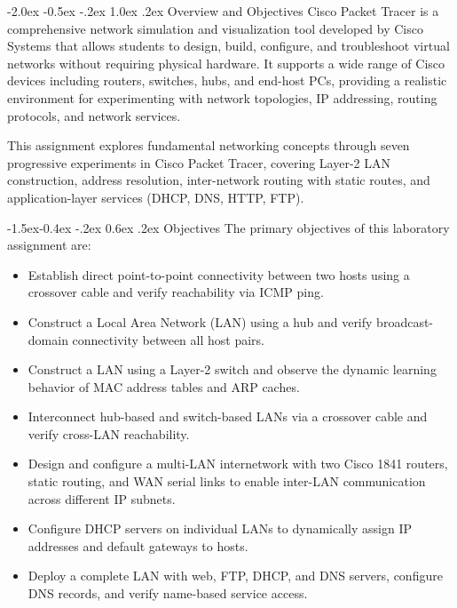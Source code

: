 \documentclass[11pt,a4paper]{article}
\makeatletter
\renewcommand\section{\@startsection {section}{1}{\z@}%
  {-2.0ex \@plus -0.5ex \@minus -.2ex}%
  {1.0ex \@plus .2ex}%
  {\normalfont\Large\bfseries}}
\renewcommand\subsection{\@startsection{subsection}{2}{\z@}%
  {-1.5ex\@plus -0.4ex \@minus -.2ex}%
  {0.6ex \@plus .2ex}%
  {\normalfont\large\bfseries}}
\makeatother
\begin{document}
\section{Overview and Objectives}
Cisco Packet Tracer is a comprehensive network simulation and visualization tool developed by Cisco Systems that allows students to design, build, configure, and troubleshoot virtual networks without requiring physical hardware. It supports a wide range of Cisco devices including routers, switches, hubs, and end-host PCs, providing a realistic environment for experimenting with network topologies, IP addressing, routing protocols, and network services.

This assignment explores fundamental networking concepts through seven progressive experiments in Cisco Packet Tracer, covering Layer-2 LAN construction, address resolution, inter-network routing with static routes, and application-layer services (DHCP, DNS, HTTP, FTP).

\subsection{Objectives}
The primary objectives of this laboratory assignment are:
\begin{itemize}
  \item Establish direct point-to-point connectivity between two hosts using a crossover cable and verify reachability via ICMP ping.
  \item Construct a Local Area Network (LAN) using a hub and verify broadcast-domain connectivity between all host pairs.
  \item Construct a LAN using a Layer-2 switch and observe the dynamic learning behavior of MAC address tables and ARP caches.
  \item Interconnect hub-based and switch-based LANs via a crossover cable and verify cross-LAN reachability.
  \item Design and configure a multi-LAN internetwork with two Cisco 1841 routers, static routing, and WAN serial links to enable inter-LAN communication across different IP subnets.
  \item Configure DHCP servers on individual LANs to dynamically assign IP addresses and default gateways to hosts.
  \item Deploy a complete LAN with web, FTP, DHCP, and DNS servers, configure DNS records, and verify name-based service access.
\end{itemize}

\end{document}
